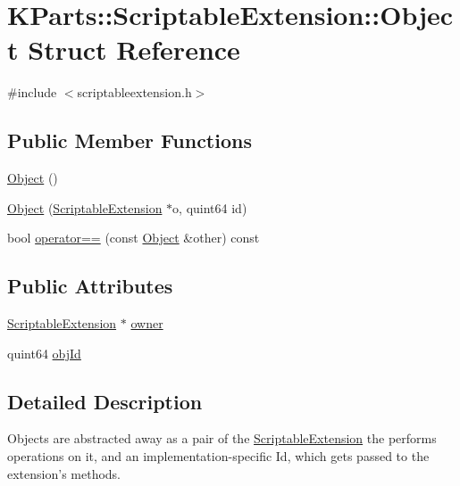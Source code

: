 \hypertarget{structKParts_1_1ScriptableExtension_1_1Object}{\section{K\+Parts\+:\+:Scriptable\+Extension\+:\+:Object Struct Reference}
\label{structKParts_1_1ScriptableExtension_1_1Object}
}


{\ttfamily \#include $<$scriptableextension.\+h$>$}

\subsection*{Public Member Functions}
\begin{DoxyCompactItemize}
\item 
\hyperlink{structKParts_1_1ScriptableExtension_1_1Object_ac328d8854e2e0ceec2b83544ed34e549}{Object} ()
\item 
\hyperlink{structKParts_1_1ScriptableExtension_1_1Object_a322cdc635a708b3e19fe61d576c3c865}{Object} (\hyperlink{classKParts_1_1ScriptableExtension}{Scriptable\+Extension} $\ast$o, quint64 id)
\item 
bool \hyperlink{structKParts_1_1ScriptableExtension_1_1Object_a9b11da1473dc4d6bedd85334b3c8f44b}{operator==} (const \hyperlink{structKParts_1_1ScriptableExtension_1_1Object}{Object} \&other) const 
\end{DoxyCompactItemize}
\subsection*{Public Attributes}
\begin{DoxyCompactItemize}
\item 
\hyperlink{classKParts_1_1ScriptableExtension}{Scriptable\+Extension} $\ast$ \hyperlink{structKParts_1_1ScriptableExtension_1_1Object_a2e2ad2aca3cec31e49e8393658a6997c}{owner}
\item 
quint64 \hyperlink{structKParts_1_1ScriptableExtension_1_1Object_a884270fd3423ea40ec2920cb15c9bd15}{obj\+Id}
\end{DoxyCompactItemize}


\subsection{Detailed Description}
Objects are abstracted away as a pair of the \hyperlink{classKParts_1_1ScriptableExtension}{Scriptable\+Extension} the performs operations on it, and an implementation-\/specific Id, which gets passed to the extension's methods.

